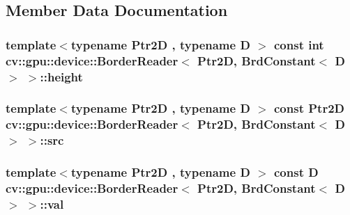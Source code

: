 \subsection{Member Data Documentation}
\hypertarget{structcv_1_1gpu_1_1device_1_1BorderReader_3_01Ptr2D_00_01BrdConstant_3_01D_01_4_01_4_a1c34bc883f2296b9e6c03a3dfaa60b33}{
\subsubsection[{height}]{\setlength{\rightskip}{0pt plus 5cm}template$<$typename Ptr2\-D , typename D $>$ const int {\bf cv\-::gpu\-::device\-::\-Border\-Reader}$<$ Ptr2\-D, {\bf Brd\-Constant}$<$ D $>$ $>$\-::height}}\label{structcv_1_1gpu_1_1device_1_1BorderReader_3_01Ptr2D_00_01BrdConstant_3_01D_01_4_01_4_a1c34bc883f2296b9e6c03a3dfaa60b33}
\hypertarget{structcv_1_1gpu_1_1device_1_1BorderReader_3_01Ptr2D_00_01BrdConstant_3_01D_01_4_01_4_a04f9764a9ae00d0e9c1406459683457a}{
\subsubsection[{src}]{\setlength{\rightskip}{0pt plus 5cm}template$<$typename Ptr2\-D , typename D $>$ const Ptr2\-D {\bf cv\-::gpu\-::device\-::\-Border\-Reader}$<$ Ptr2\-D, {\bf Brd\-Constant}$<$ D $>$ $>$\-::src}}\label{structcv_1_1gpu_1_1device_1_1BorderReader_3_01Ptr2D_00_01BrdConstant_3_01D_01_4_01_4_a04f9764a9ae00d0e9c1406459683457a}
\hypertarget{structcv_1_1gpu_1_1device_1_1BorderReader_3_01Ptr2D_00_01BrdConstant_3_01D_01_4_01_4_aef2117271ba81b22855f592ce84e2dd2}{
\subsubsection[{val}]{\setlength{\rightskip}{0pt plus 5cm}template$<$typename Ptr2\-D , typename D $>$ const D {\bf cv\-::gpu\-::device\-::\-Border\-Reader}$<$ Ptr2\-D, {\bf Brd\-Constant}$<$ D $>$ $>$\-::val}}\label{structcv_1_1gpu_1_1device_1_1BorderReader_3_01Ptr2D_00_01BrdConstant_3_01D_01_4_01_4_aef2117271ba81b22855f592ce84e2dd2}
